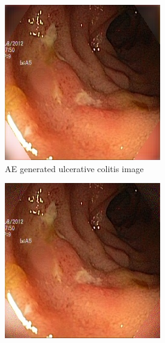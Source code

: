 \begin{figure}[h]
\begin{subfigure}[t]{\myfigsizethree}
            \includegraphics[width=\textwidth]{experiments/figures/blackcorner/ucAE.jpg}
            \caption{ AE generated ulcerative colitis image }    
            \label{fig:polyp_AE_CORNER2}
        \end{subfigure}
        \qquad
        \begin{subfigure}[t]{\myfigsizethree}  
            \centering 
            \includegraphics[width=\textwidth]{experiments/figures/blackcorner/ucGAN.jpg}

\end{subfigure}
\end{figure}
